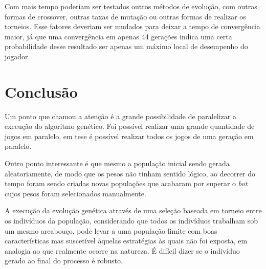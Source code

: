 \documentclass[a4paper,titlepage,11pt]{article}
\begin{document}
Com mais tempo poderiam ser testados outros métodos de evolução, com outras formas de crossover, outras taxas de mutação ou outras formas de realizar os torneios. Esse fatores deveriam ser mudados para deixar a tempo de convergência maior, já que uma convergência em apenas 44 gerações indica uma certa probabilidade desse resultado ser apenas um máximo local de desempenho do jogador.

\section{Conclusão}
Um ponto que chamou a atenção é a grande possibilidade de paralelizar a execução do algoritmo genético. Foi possível realizar uma grande quantidade de jogos em paralelo, em tese é possível realizar todos os jogos de uma geração em paralelo. 

Outro ponto interessante é que mesmo a população inicial sendo gerada aleatoriamente, de modo que os pesos não tinham sentido lógico, ao decorrer do tempo foram sendo criadas novas populações que acabaram por superar o {\em bot} cujos pesos foram selecionados manualmente.

A execução da evolução genética através de uma seleção baseada em torneio entre os indivíduos da população, considerando que todos os indivíduos trabalham sob um mesmo arcabouço, pode levar a uma população limite com boas características mas suscetível àquelas estratégias às quais não foi exposta, em analogia ao que realmente ocorre na natureza. É difícil dizer se o indivíduo gerado ao final do processo é robusto.
\end{document}
